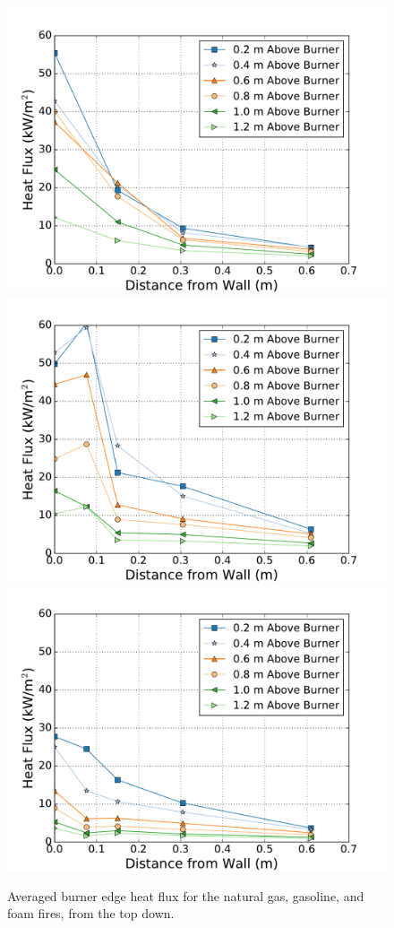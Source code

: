 \documentclass[twoside]{uocthesis}
\begin{document}
{\begin{figure}[p]
	\centering
	\includegraphics[width=.625\columnwidth]{../Figures/IWGB_NG_HF_Offset_Avg}\\
	\includegraphics[width=.625\columnwidth]{../Figures/IWGB_GAS_HF_Offset_Avg}\\
	\includegraphics[width=.625\columnwidth]{../Figures/IWGB_PUF_HF_Offset_Avg}\\
	\caption[Averaged burner edge heat flux for the natural gas, gasoline, and foam fires]{Averaged burner edge heat flux for the natural gas, gasoline, and foam fires, from the top down.}
	\label{IWGB_HF_Comp_Edge}
\end{figure}

}
\end{document}
